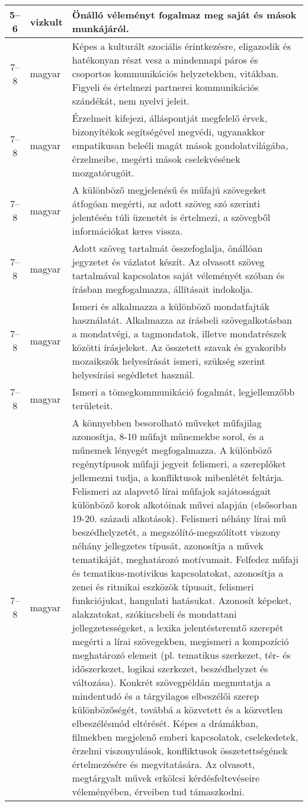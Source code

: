 \begin{small}
\begin{longtable}{c | p{2cm} |  p{11cm} }
              5--6 & vizkult & Önálló véleményt fogalmaz meg saját és mások munkájáról. \\ \hline
              7--8 & magyar & Képes a kulturált szociális érintkezésre, eligazodik és hatékonyan részt vesz a mindennapi páros és csoportos kommunikációs helyzetekben, vitákban. Figyeli és értelmezi partnerei kommunikációs szándékát, nem nyelvi jeleit.  \\ \hline
              7--8 & magyar & Érzelmeit kifejezi, álláspontját megfelelő érvek, bizonyítékok segítségével megvédi, ugyanakkor empatikusan beleéli magát mások gondolatvilágába, érzelmeibe, megérti mások cselekvésének mozgatórugóit. \\ \hline
              7--8 & magyar & A különböző megjelenésű és műfajú szövegeket átfogóan megérti, az adott szöveg szó szerinti jelentésén túli üzenetét is értelmezi, a szövegből információkat keres vissza. \\ \hline
              7--8 & magyar & Adott szöveg tartalmát összefoglalja, önállóan jegyzetet és vázlatot készít. Az olvasott szöveg tartalmával kapcsolatos saját véleményét szóban és írásban megfogalmazza, állításait indokolja. \\ \hline
              7--8 & magyar & Ismeri és alkalmazza a különböző mondatfajták használatát. Alkalmazza az írásbeli szövegalkotásban a mondatvégi, a tagmondatok, illetve mondatrészek közötti írásjeleket. Az összetett szavak és gyakoribb mozaikszók helyesírását ismeri, szükség szerint helyesírási segédletet használ. \\ \hline
              7--8 & magyar & Ismeri a tömegkommunikáció fogalmát, legjellemzőbb területeit. \\ \hline
              7--8 & magyar & A könnyebben besorolható műveket műfajilag azonosítja, 8-10 műfajt műnemekbe sorol, és a műnemek lényegét megfogalmazza. A különböző regénytípusok műfaji jegyeit felismeri, a szereplőket jellemezni tudja, a konfliktusok mibenlétét feltárja. Felismeri az alapvető lírai műfajok sajátosságait különböző korok alkotóinak művei alapján (elsősorban 19-20. századi alkotások). Felismeri néhány lírai mű beszédhelyzetét, a megszólító-megszólított viszony néhány jellegzetes típusát, azonosítja a művek tematikáját, meghatározó motívumait. Felfedez műfaji és tematikus-motivikus kapcsolatokat, azonosítja a zenei és ritmikai eszközök típusait, felismeri funkciójukat, hangulati hatásukat. Azonosít képeket, alakzatokat, szókincsbeli és mondattani jellegzetességeket, a lexika jelentésteremtő szerepét megérti a lírai szövegekben, megismeri a kompozíció meghatározó elemeit (pl. tematikus szerkezet, tér- és időszerkezet, logikai szerkezet, beszédhelyzet és változása). Konkrét szövegpéldán megmutatja a mindentudó és a tárgyilagos elbeszélői szerep különbözőségét, továbbá a közvetett és a közvetlen elbeszélésmód eltérését. Képes a drámákban, filmekben megjelenő emberi kapcsolatok, cselekedetek, érzelmi viszonyulások, konfliktusok összetettségének értelmezésére és megvitatására. Az olvasott, megtárgyalt művek erkölcsi kérdésfeltevéseire véleményében, érveiben tud támaszkodni. \\ \hline

\end{longtable}
\end{small}
